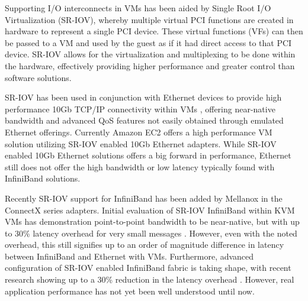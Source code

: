 \documentclass[10pt]{sigplanconf}
\begin{document}
Supporting I/O interconnects in VMs has been aided by Single Root I/O Virtualization (SR-IOV), whereby multiple virtual PCI functions are created in hardware to represent a single PCI device. These virtual functions (VFs) can then be passed to a VM and used by the guest as if it had direct access to that PCI device. SR-IOV allows for the virtualization and multiplexing to be done within the hardware, effectively providing higher performance and greater control than software solutions. 

SR-IOV has been used in conjunction with Ethernet devices to provide high performance 10Gb TCP/IP connectivity within VMs \cite{Liu2010}, offering near-native bandwidth and advanced QoS features not easily obtained through emulated Ethernet offerings. Currently Amazon EC2 offers a high performance VM solution utilizing SR-IOV enabled 10Gb Ethernet adapters. While SR-IOV enabled 10Gb Ethernet solutions offers a big forward in performance, Ethernet still does not offer the high bandwidth or low latency typically found with InfiniBand solutions. 

Recently SR-IOV support for InfiniBand has been added by Mellanox in the ConnectX series adapters. Initial evaluation of SR-IOV InfiniBand within KVM VMs has demonstration point-to-point bandwidth to be near-native, but with up to 30\% latency overhead for very small messages \cite{jose2013sr, RuivoAGTKNR14}. However, even with the noted overhead, this still signifies up to an order of magnitude difference in latency between InfiniBand and Ethernet with VMs. Furthermore, advanced configuration of SR-IOV enabled InfiniBand fabric is taking shape, with recent research showing up to a 30\% reduction in the latency overhead \cite{Musleh2014cloud}. However, real application performance has not yet been well understood until now. 
\end{document}
